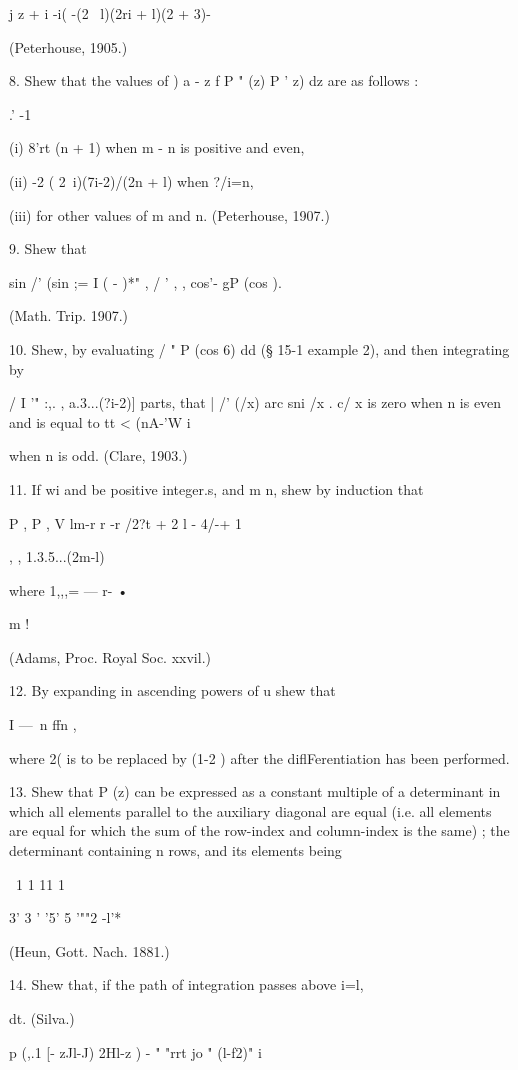 {{{{j z + i -i( -(2 \ l)(2ri + l)(2 + 3)-

(Peterhouse, 1905.)

8. Shew that the values of ) a - z f P " (z) P ' z) dz are as follows
:

.' -1

(i) 8'rt (n + 1) when m - n is positive and even,

(ii) -2 ( 2\ i)(7i-2)/(2n + l) when ?/i=n,

(iii) for other values of m and n. (Peterhouse, 1907.)

9. Shew that

sin /' (sin ;= I ( - )*" , / ' , , cos'- gP (cos ).

(Math. Trip. 1907.)

10. Shew, by evaluating / " P (cos 6) dd (§ 15-1 example 2), and then
integrating by

/ I '" :,. , a.3...(?i-2)] parts, that | /' (/x) arc sni /x . c/ x is
zero when n is even and is equal to tt < (nA-'W i

when n is odd. (Clare, 1903.)

11. If wi and be positive integer.s, and m n, shew by induction that

P , P , V lm-r r -r /2?t + 2 l - 4/-+ 1 \

, , 1.3.5...(2m-l)

where 1,,,= — r- •

m !

(Adams, Proc. Royal Soc. xxvil.)

12. By expanding in ascending powers of u shew that

I —\ n ffn ,

where 2( is to be replaced by (1-2 ) after the diflFerentiation has
been performed.

13. Shew that P (z) can be expressed as a constant multiple of a
determinant in which all elements parallel to the auxiliary diagonal
are equal (i.e. all elements are equal for which the sum of the
row-index and column-index is the same) ; the determinant containing n
rows, and its elements being

\ 1 1 11 1

3' 3 ' '5' 5 '""2 -l'*

(Heun, Gott. Nach. 1881.)

14. Shew that, if the path of integration passes above i=l,

dt. (Silva.)



p (,.1 [- zJl-J) 2Hl-z ) - " "rrt jo " (l-f2)" i

}}}}
